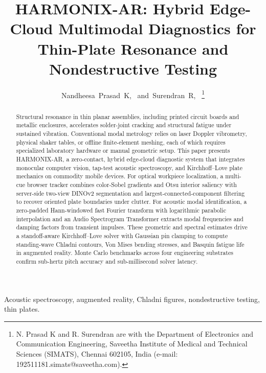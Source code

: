 \documentclass[journal]{IEEEtran}
\begin{document}

\title{HARMONIX-AR: Hybrid Edge-Cloud Multimodal Diagnostics for Thin-Plate Resonance and Nondestructive Testing}

\author{Nandheesa~Prasad~K,~
        and~Surendran~R,~%
\thanks{N. Prasad K and R. Surendran are with the Department of Electronics and Communication Engineering, Saveetha Institute of Medical and Technical Sciences (SIMATS), Chennai 602105, India (e-mail: 192511181.simats@saveetha.com).}}

\maketitle

\begin{abstract}
Structural resonance in thin planar assemblies, including printed circuit boards and metallic enclosures, accelerates solder-joint cracking and structural fatigue under sustained vibration. Conventional modal metrology relies on laser Doppler vibrometry, physical shaker tables, or offline finite-element meshing, each of which requires specialized laboratory hardware or manual geometric setup. This paper presents HARMONIX-AR, a zero-contact, hybrid edge-cloud diagnostic system that integrates monocular computer vision, tap-test acoustic spectroscopy, and Kirchhoff--Love plate mechanics on commodity mobile devices. For optical workpiece localization, a multi-cue browser tracker combines color-Sobel gradients and Otsu interior saliency with server-side two-view DINOv2 segmentation and largest-connected-component filtering to recover oriented plate boundaries under clutter. For acoustic modal identification, a zero-padded Hann-windowed fast Fourier transform with logarithmic parabolic interpolation and an Audio Spectrogram Transformer extracts modal frequencies and damping factors from transient impulses. These geometric and spectral estimates drive a standoff-aware Kirchhoff--Love solver with Gaussian pin clamping to compute standing-wave Chladni contours, Von Mises bending stresses, and Basquin fatigue life in augmented reality. Monte Carlo benchmarks across four engineering substrates confirm sub-hertz pitch accuracy and sub-millisecond solver latency.
\end{abstract}

\begin{IEEEkeywords}
Acoustic spectroscopy, augmented reality, Chladni figures, nondestructive testing, thin plates.
\end{IEEEkeywords}
\end{document}
